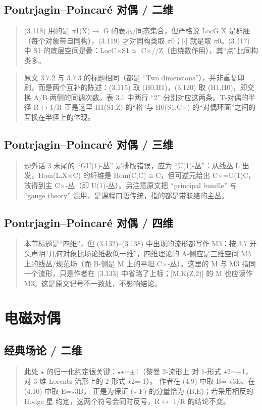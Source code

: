 \subsection*{Pontrjagin--Poincaré 对偶 / 二维}
\begin{quote}\small
(3.118) 用的是 $\pi$1(X)$\to$ G 的表示/同态集合，但严格说 LocG X 是群胚（每个对象带自同构），(3.119) 才对同构类取 $\pi$0；|$\cdot$| 就是取 $\pi$0。(3.117) 中 S1 的底层空间是叠：LocC$\times$S1$\simeq$ C$\times$//Z（由绕数作用），其“点”比同构类多。
\end{quote}

\begin{quote}\small
原文 3.7.2 与 3.7.3 的标题相同（都是 “Two dimensions”），并非重复印刷，而是两个互补的陈述：(3.115) 取 (H0,H1)，(3.120) 取 (H1,H0)，即交换 A/B 两侧的同调次数。表 3.1 中两行 “2” 分别对应这两条。T-对偶的半径 R$\leftrightarrow$1/R 正是这里 H1(S1,Z) 的“格”与 H0(S1,C$\times$) 的“对偶环面”之间的互换在半径上的体现。
\end{quote}

\subsection*{Pontrjagin--Poincaré 对偶 / 三维}
\begin{quote}\small
题外话 3 末尾的 “GU(1)-丛” 是排版错误，应为 “U(1)-丛”：从线丛 L 出发，Hom(L,X$\times$C) 的纤维是 Hom(C,C)$\cong$C，但可逆元给出 C$\times$=U(1)C，故得到主 C$\times$-丛（即 U(1)-丛）。另注意原文把 “principal bundle” 与 “gauge theory” 混用，是课程口语传统，指的都是带联络的主丛。
\end{quote}

\subsection*{Pontrjagin--Poincaré 对偶 / 四维}
\begin{quote}\small
本节标题是“四维”，但 (3.132)--(3.138) 中出现的流形都写作 M3：按 3.7 开头声明“几何对象比场论维数低一维”，四维理论的 A-侧应是三维空间 M3 上的线丛/规范场（而 B-侧是 M 上的平坦 C$\times$-丛）。这里的 M 与 M3 指同一个流形，只是作者在 (3.133) 中省略了上标；[M,K(Z,2)] 的 M 也应读作 M3。这是原文记号不一致处，不影响结论。
\end{quote}

\section{电磁对偶}
\subsection*{经典场论 / 二维}
\begin{quote}\small
此处 $\star$ 的归一化约定很关键：$\star$$\star$=$\pm$1（黎曼 2-流形上 对 1-形式 $\star$2=+1，对 3-维 Lorentz 流形上的 2-形式 $\star$2=-1）。 作者在 (4.9) 中取 B=-$\star$3E、在 (4.10) 中取 E=$\star$3B， 正是为保证 ($\star$ F) 的分量恰为 (B,E)；若采用相反的 Hodge 星 约定，这两个符号会同时反号，R$\leftrightarrow$ 1/R 的结论不变。
\end{quote}

